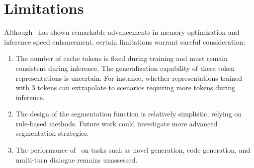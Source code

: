 \section*{Limitations}
Although \ours~has shown remarkable advancements in memory optimization and inference speed enhancement, certain limitations warrant careful consideration:
\begin{enumerate}




    \item The number of cache tokens is fixed during training and must remain consistent during inference. 
    The generalization capability of these token representations is uncertain. 
    For instance, whether representations trained with 3 tokens can extrapolate to scenarios requiring more tokens during inference.

    \item The design of the segmentation function is relatively simplistic, relying on rule-based methods. 
    Future work could investigate more advanced segmentation strategies.

    \item The performance of \ours~on tasks such as novel generation, code generation, and multi-turn dialogue remains unassessed.


\end{enumerate}